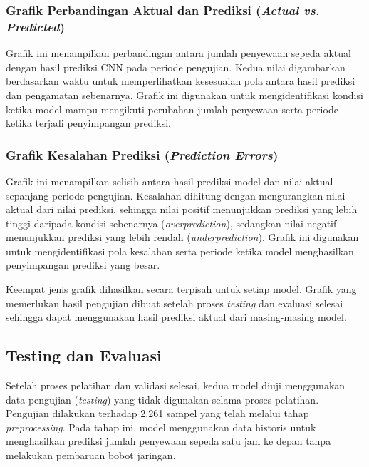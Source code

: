 \documentclass[10pt,conference]{IEEEtran}
\begin{document}
\subsubsection{Grafik Perbandingan Aktual dan Prediksi (\textit{Actual vs. Predicted})}
\leavevmode\par\nopagebreak

Grafik ini menampilkan perbandingan antara jumlah penyewaan sepeda aktual dengan hasil prediksi CNN pada periode pengujian. Kedua nilai digambarkan berdasarkan waktu untuk memperlihatkan kesesuaian pola antara hasil prediksi dan pengamatan sebenarnya. Grafik ini digunakan untuk mengidentifikasi kondisi ketika model mampu mengikuti perubahan jumlah penyewaan serta periode ketika terjadi penyimpangan prediksi.

\subsubsection{Grafik Kesalahan Prediksi (\textit{Prediction Errors})}
\leavevmode\par\nopagebreak

Grafik ini menampilkan selisih antara hasil prediksi model dan nilai aktual sepanjang periode pengujian. Kesalahan dihitung dengan mengurangkan nilai aktual dari nilai prediksi, sehingga nilai positif menunjukkan prediksi yang lebih tinggi daripada kondisi sebenarnya (\textit{overprediction}), sedangkan nilai negatif menunjukkan prediksi yang lebih rendah (\textit{underprediction}). Grafik ini digunakan untuk mengidentifikasi pola kesalahan serta periode ketika model menghasilkan penyimpangan prediksi yang besar.

Keempat jenis grafik dihasilkan secara terpisah untuk setiap model. Grafik yang memerlukan hasil pengujian dibuat setelah proses \textit{testing} dan evaluasi selesai sehingga dapat menggunakan hasil prediksi aktual dari masing-masing model.

\subsection{Testing dan Evaluasi}

Setelah proses pelatihan dan validasi selesai, kedua model diuji menggunakan data pengujian (\textit{testing}) yang tidak digunakan selama proses pelatihan. Pengujian dilakukan terhadap 2.261 sampel yang telah melalui tahap \textit{preprocessing}. Pada tahap ini, model menggunakan data historis untuk menghasilkan prediksi jumlah penyewaan sepeda satu jam ke depan tanpa melakukan pembaruan bobot jaringan.
\end{document}
